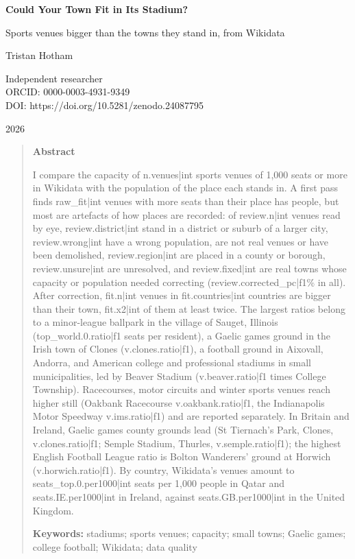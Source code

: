 \documentclass[11pt,a4paper]{article}
\begin{document}
\begin{center}
{\Large\bfseries Could Your Town Fit in Its Stadium?\par}
\vspace{0.4em}
{\large Sports venues bigger than the towns they stand in, from Wikidata\par}
\vspace{1.2em}
{\large Tristan Hotham\par}
\vspace{0.3em}
{\small Independent researcher\\
ORCID: 0000-0003-4931-9349\\
DOI: https://doi.org/10.5281/zenodo.24087795\par}
\vspace{0.8em}
2026
\end{center}

\begin{quote}
\small
\begin{center}\textbf{Abstract}\end{center}
I compare the capacity of {{n.venues|int}} sports venues of 1,000 seats or more in Wikidata with the population of the place each stands in. A first pass finds {{raw_fit|int}} venues with more seats than their place has people, but most are artefacts of how places are recorded: of {{review.n|int}} venues read by eye, {{review.district|int}} stand in a district or suburb of a larger city, {{review.wrong|int}} have a wrong population, are not real venues or have been demolished, {{review.region|int}} are placed in a county or borough, {{review.unsure|int}} are unresolved, and {{review.fixed|int}} are real towns whose capacity or population needed correcting ({{review.corrected_pc|f1}}\% in all). After correction, {{fit.n|int}} venues in {{fit.countries|int}} countries are bigger than their town, {{fit.x2|int}} of them at least twice. The largest ratios belong to a minor-league ballpark in the village of Sauget, Illinois ({{top_world.0.ratio|f1}} seats per resident), a Gaelic games ground in the Irish town of Clones ({{v.clones.ratio|f1}}), a football ground in Aixovall, Andorra, and American college and professional stadiums in small municipalities, led by Beaver Stadium ({{v.beaver.ratio|f1}} times College Township). Racecourses, motor circuits and winter sports venues reach higher still (Oakbank Racecourse {{v.oakbank.ratio|f1}}, the Indianapolis Motor Speedway {{v.ims.ratio|f1}}) and are reported separately. In Britain and Ireland, Gaelic games county grounds lead (St Tiernach's Park, Clones, {{v.clones.ratio|f1}}; Semple Stadium, Thurles, {{v.semple.ratio|f1}}); the highest English Football League ratio is Bolton Wanderers' ground at Horwich ({{v.horwich.ratio|f1}}). By country, Wikidata's venues amount to {{seats_top.0.per1000|int}} seats per 1,000 people in Qatar and {{seats.IE.per1000|int}} in Ireland, against {{seats.GB.per1000|int}} in the United Kingdom.

\textbf{Keywords:} stadiums; sports venues; capacity; small towns; Gaelic games; college football; Wikidata; data quality
\end{quote}
\end{document}
